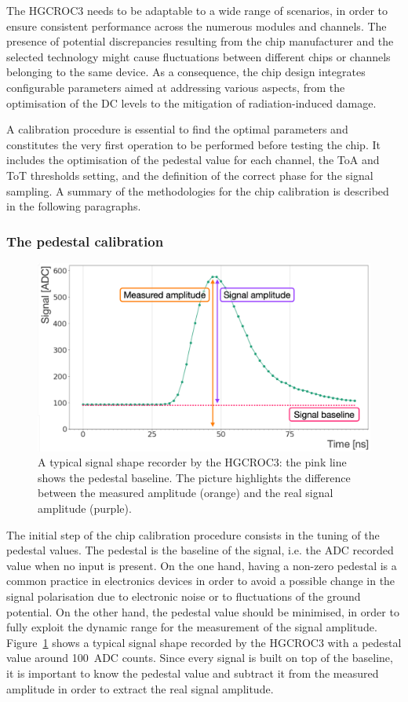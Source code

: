The HGCROC3 needs to be adaptable to a wide range of scenarios, in order to ensure consistent performance across the numerous modules and channels. The presence of potential discrepancies resulting from the chip manufacturer and the selected technology might cause fluctuations between different chips or channels belonging to the same device. As a consequence, the chip design integrates configurable parameters aimed at addressing various aspects, from the optimisation of the DC levels to the mitigation of radiation-induced damage. 

A calibration procedure is essential to find the optimal parameters and constitutes the very first operation to be performed before testing the chip. It includes the optimisation of the pedestal value for each channel, the ToA and ToT thresholds setting, and the definition of the correct phase for the signal sampling. A summary of the methodologies for the chip calibration is described in the following paragraphs.

\subsubsection{The pedestal calibration}
\label{subsubsec:The pedestal calibration}

\begin{figure} [b]
    \centering
    \includegraphics[width=0.5\linewidth]{Figures/HGCAL/SignalBaseline.pdf}
    \caption{A typical signal shape recorder by the HGCROC3: the pink line shows the pedestal baseline. The picture highlights the difference between the measured amplitude (orange) and the real signal amplitude (purple).}
    \label{fig:SignalBaseline}
\end{figure}

The initial step of the chip calibration procedure consists in the tuning of the pedestal values. The pedestal is the baseline of the signal, i.e. the ADC recorded value when no input is present. On the one hand, having a non-zero pedestal is a common practice in electronics devices in order to avoid a possible change in the signal polarisation due to electronic noise or to fluctuations of the ground potential. On the other hand, the pedestal value should be minimised, in order to fully exploit the dynamic range for the measurement of the signal amplitude.
Figure~\ref{fig:SignalBaseline} shows a typical signal shape recorded by the HGCROC3 with a pedestal value around 100~ADC counts. Since every signal is built on top of the baseline, it is important to know the pedestal value and subtract it from the measured amplitude in order to extract the real signal amplitude.

